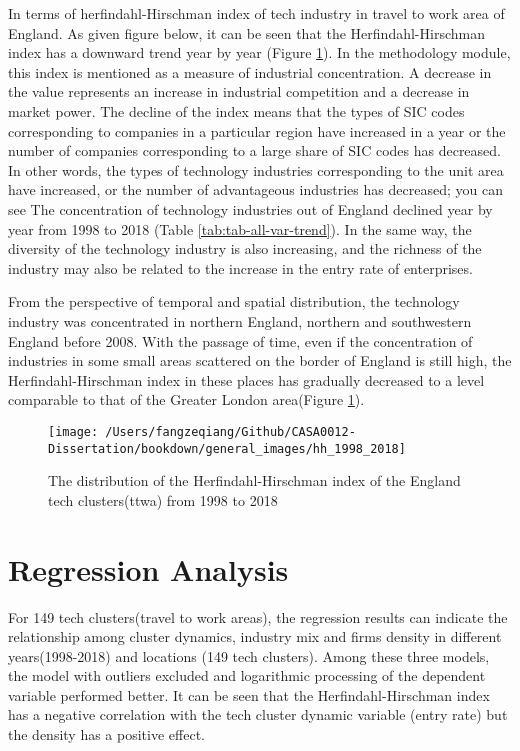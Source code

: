 \documentclass[
  12pt,
  oneside]{book}
\begin{document}
In terms of herfindahl-Hirschman index of tech industry in travel to work area of England. As given figure below, it can be seen that the Herfindahl-Hirschman index has a downward trend year by year (Figure \ref{fig:fig-hh-1998-2018}). In the methodology module, this index is mentioned as a measure of industrial concentration. A decrease in the value represents an increase in industrial competition and a decrease in market power. The decline of the index means that the types of SIC codes corresponding to companies in a particular region have increased in a year or the number of companies corresponding to a large share of SIC codes has decreased. In other words, the types of technology industries corresponding to the unit area have increased, or the number of advantageous industries has decreased; you can see The concentration of technology industries out of England declined year by year from 1998 to 2018 (Table \ref{tab:tab-all-var-trend}). In the same way, the diversity of the technology industry is also increasing, and the richness of the industry may also be related to the increase in the entry rate of enterprises.

From the perspective of temporal and spatial distribution, the technology industry was concentrated in northern England, northern and southwestern England before 2008. With the passage of time, even if the concentration of industries in some small areas scattered on the border of England is still high, the Herfindahl-Hirschman index in these places has gradually decreased to a level comparable to that of the Greater London area(Figure \ref{fig:fig-hh-1998-2018}).

\begin{figure}
\texttt{[image: /Users/fangzeqiang/Github/CASA0012-Dissertation/bookdown/general\_images/hh\_1998\_2018]} \caption{The distribution of the Herfindahl-Hirschman index of the England tech clusters(ttwa) from 1998 to 2018}\label{fig:fig-hh-1998-2018}
\end{figure}

\hypertarget{regression-analysis}{%
\section{Regression Analysis}\label{regression-analysis}}

For 149 tech clusters(travel to work areas), the regression results can indicate the relationship among cluster dynamics, industry mix and firms density in different years(1998-2018) and locations (149 tech clusters). Among these three models, the model with outliers excluded and logarithmic processing of the dependent variable performed better. It can be seen that the Herfindahl-Hirschman index has a negative correlation with the tech cluster dynamic variable (entry rate) but the density has a positive effect.
\end{document}
